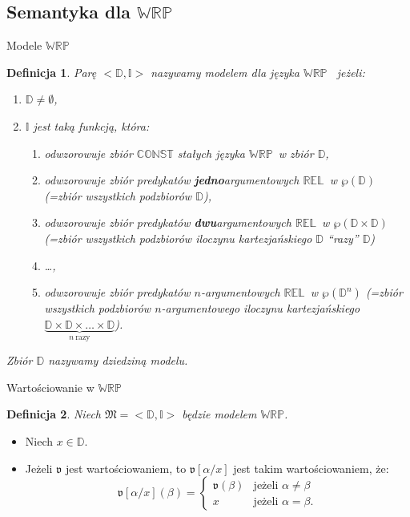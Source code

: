 \documentclass{beamer}
\newtheorem{definicja}{Definicja}
\newcommand {\WRP} {\ensuremath{\mathbb{WRP}}}
\newcommand {\Rel} {\ensuremath{\mathbb{REL}}}
\begin{document}
\subsection{Semantyka dla \WRP}


\begin{frame}{Modele \WRP}
%
\begin{definicja}
Parę $<\mathbb{D}, \mathbb{I}>$ nazywamy modelem dla języka \WRP~ jeżeli:
%
\begin{enumerate}
\item $\mathbb{D} \neq \emptyset$,
%
\item $\mathbb{I}$ jest taką funkcją, która:
%
\begin{enumerate}
\item odwzorowuje zbiór $\mathbb{CONST}$ stałych języka \WRP\   w zbiór $\mathbb{D}$,
%
\item odwzorowuje zbiór predykatów \textbf{jedno}argumentowych \Rel\  w $\wp(\mathbb{D})$ (=zbiór wszystkich podzbiorów $\mathbb{D}$),
%
\item odwzorowuje zbiór predykatów \textbf{dwu}argumentowych \Rel\  w $\wp(\mathbb{D} \times \mathbb{D})$ (=zbiór wszystkich podzbiorów iloczynu kartezjańskiego $\mathbb{D}$ ``razy'' $\mathbb{D}$)
\item \dots,
%
\item odwzorowuje zbiór predykatów $n$-argumentowych \Rel\  w $\wp(\mathbb{D}^{n})$ (=zbiór wszystkich podzbiorów $n$-argumentowego iloczynu kartezjańskiego $\underbrace {\mathbb{D} \times \mathbb{D} \times \dots \times \mathbb{D}}_{n \mathrm{~razy}}$).
\end{enumerate}
\end{enumerate}
%
Zbiór $\mathbb{D}$ nazywamy dziedziną modelu. %
\end{definicja}
\end{frame}

\begin{frame}{Wartościowanie w \WRP}
%
\begin{definicja}
Niech $\mathfrak{M}=<\mathbb{D}, \mathbb{I}>$ będzie modelem \WRP. %
\end{definicja}
%
\begin{itemize}
\item Niech $x \in \mathbb{D}$.
%
\item Jeżeli $\mathfrak{v}$ jest wartościowaniem, to $\mathfrak{v}[\alpha/x]$ jest takim wartościowaniem, że:
%
\begin{equation}
\mathfrak{v}[\alpha/x](\beta)= \left\{
\begin{array}{rl}
\mathfrak{v}(\beta) & \text{jeżeli } \alpha \ne \beta \\
x & \text{jeżeli } \alpha = \beta.
\end{array} \right.
\end{equation}
\end{itemize}
\end{frame}
\end{document}
